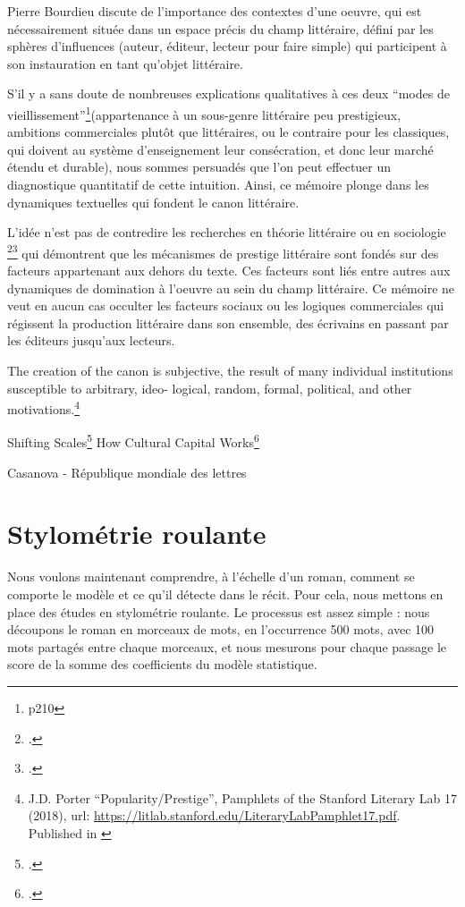 Pierre Bourdieu discute de l'importance des contextes d'une oeuvre, qui est nécessairement située dans un espace précis du champ littéraire, défini par les sphères d'influences (auteur, éditeur, lecteur pour faire simple) qui participent à son instauration en tant qu'objet littéraire. 

S'il y a sans doute de nombreuses explications qualitatives à ces deux \enquote{modes de vieillissement}\footnote{\cite{bourdieu_les_1992} p210}(appartenance à un sous-genre littéraire peu prestigieux, ambitions commerciales plutôt que littéraires, ou le contraire pour les classiques, qui doivent au système d'enseignement leur consécration, et donc leur marché étendu et durable), nous sommes persuadés que l'on peut effectuer un diagnostique quantitatif de cette intuition. Ainsi, ce mémoire plonge dans les dynamiques textuelles qui fondent le canon littéraire.

L'idée n'est pas de contredire les recherches en théorie littéraire ou en sociologie \footcites{bourdieu_distinction_2012}\footcites{bourdieu_les_1992} qui démontrent que les mécanismes de prestige littéraire sont fondés sur des facteurs appartenant aux dehors du texte. Ces facteurs sont liés entre autres aux dynamiques de domination à l'oeuvre au sein du champ littéraire. Ce mémoire ne veut en aucun cas occulter les facteurs sociaux ou les logiques commerciales qui régissent la production littéraire dans son ensemble, des écrivains en passant par les éditeurs jusqu'aux lecteurs. 

The creation of the canon is subjective, the result of many individual institutions susceptible to arbitrary, ideo-
logical, random, formal, political, and other motivations.\footnote{J.D. Porter \enquote{Popularity/Prestige}, Pamphlets of the Stanford Literary Lab 17 (2018), url: \url{https://litlab.stanford.edu/LiteraryLabPamphlet17.pdf}. Published in \cite{moretti_canonarchive_2017}}

Shifting Scales\footcites{english_shifting_2016}
How Cultural Capital Works\footcites{piper_how_2016}

Casanova - République mondiale des lettres



\newpage
\section{Stylométrie roulante}

Nous voulons maintenant comprendre, à l'échelle d'un roman, comment se comporte le modèle et ce qu'il détecte dans le récit. Pour cela, nous mettons en place des études en stylométrie roulante. Le processus est assez simple : nous découpons le roman en morceaux de mots, en l'occurrence 500 mots, avec 100 mots partagés entre chaque morceaux, et nous mesurons pour chaque passage le score de la somme des coefficients du modèle statistique. 

